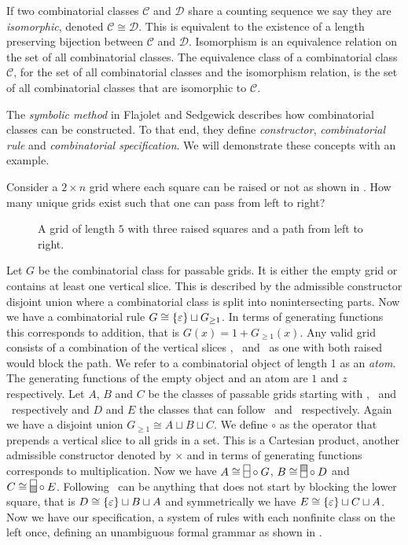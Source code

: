 If two combinatorial classes $\mathcal{C}$ and $\mathcal{D}$ share a counting sequence we say they are \emph{isomorphic}, denoted $\mathcal{C} \cong \mathcal{D}$. This is equivalent to the existence of a length preserving bijection between $\mathcal{C}$ and $\mathcal{D}$. Isomorphism is an equivalence relation on the set of all combinatorial classes. The equivalence class of a combinatorial class $\mathcal{C}$, for the set of all combinatorial classes and the isomorphism relation, is the set of all combinatorial classes that are isomorphic to $\mathcal{C}$.

The \emph{symbolic method} in Flajolet and Sedgewick \cite{flajolet:ac} describes how combinatorial classes can be constructed. To that end, they define \emph{constructor}, \emph{combinatorial rule} and \emph{combinatorial specification}. We will demonstrate these concepts with an example. 

Consider a $2 \times n$ grid where each square can be raised or not as shown in . How many unique grids exist such that one can pass from left to right?

\begin{figure}[ht!]
    \centering
    
    \caption{A grid of length $5$ with three raised squares and a path from left to right.}
    \label{fig:raised_grid}
\end{figure}

Let $G$ be the combinatorial class for passable grids. It is either the empty grid or contains at least one vertical slice. This is described by the admissible constructor disjoint union where a combinatorial class is split into nonintersecting parts. Now we have a combinatorial rule $G \cong \left\{\varepsilon\right\} \sqcup G_{\geq 1}$. In terms of generating functions this corresponds to addition, that is $G(x) = 1 + G_{\geq1}(x)$. Any valid grid consists of a combination of the vertical slices \gridN, \gridU\ and \gridD\ as one with both raised would block the path. We refer to a combinatorial object of length 1 as an \emph{atom}. The generating functions of the empty object and an atom are $1$ and $z$ respectively. Let $A$, $B$ and $C$ be the classes of passable grids starting with \gridN, \gridU\ and \gridD\ respectively and $D$ and $E$ the classes that can follow \gridU\ and \gridD\ respectively. Again we have a disjoint union $G_{\geq1} \cong A \sqcup B \sqcup C$. We define $\circ$ as the operator that prepends a vertical slice to all grids in a set. This is a Cartesian product, another admissible constructor denoted by $\times$ and in terms of generating functions corresponds to multiplication. Now we have $A \cong \gridN \circ G$, $B \cong \gridU \circ D$ and $C \cong \gridD \circ E$. Following \gridU\ can be anything that does not start by blocking the lower square, that is $D \cong \left\{\varepsilon\right\} \sqcup B \sqcup A$ and symmetrically we have $E \cong \left\{\varepsilon\right\} \sqcup C \sqcup A$. Now we have our specification, a system of rules with each nonfinite class on the left once, defining an unambiguous formal grammar as shown in .

